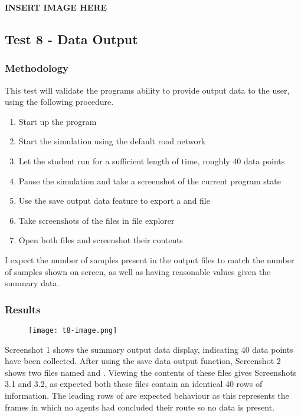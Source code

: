             \textbf{INSERT IMAGE HERE}

    \subsection{Test 8 - Data Output}
    \label{testing:t8}

        \subsubsection{Methodology}

            This test will validate the programs ability to provide output data to the user, using the following procedure.

            \begin{enumerate}
                \item Start up the program
                \item Start the simulation using the default road network
                \item Let the student run for a sufficient length of time, roughly 40 data points
                \item Pause the simulation and take a screenshot of the current program state
                \item Use the save output data feature to export a  and  file
                \item Take screenshots of the files in file explorer
                \item Open both files and screenshot their contents
            \end{enumerate}

            I expect the number of samples present in the output files to match the number of samples shown on screen, as well as having reasonable values given the summary data.

        \subsubsection{Results}

            \begin{figure}[ht]
                \centering
                \texttt{[image: t8-image.png]}
                \caption{}
                \label{testing:t8-image}
            \end{figure}

            Screenshot 1 shows the summary output data display, indicating 40 data points have been collected. After using the save data output function, Screenshot 2 shows two files named  and . Viewing the contents of these files gives Screenshots 3.1 and 3.2, as expected both these files contain an identical 40 rows of information. The leading rows of  are expected behaviour as this represents the frames in which no agents had concluded their route so no data is present.

